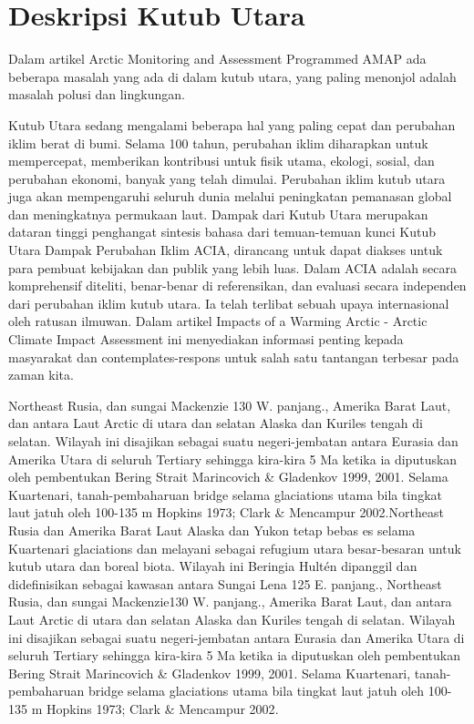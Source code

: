 %

\section{Deskripsi Kutub Utara}	

		Dalam artikel Arctic Monitoring and Assessment Programmed {AMAP}  ada beberapa masalah yang ada di dalam 
	kutub utara, yang paling menonjol adalah masalah polusi dan lingkungan.
		
		Kutub Utara sedang mengalami beberapa hal yang paling cepat dan perubahan iklim berat di bumi. Selama 100 tahun, perubahan
	iklim diharapkan untuk mempercepat, memberikan kontribusi untuk fisik utama, ekologi, sosial, dan perubahan ekonomi, banyak yang 
	telah dimulai. Perubahan iklim kutub utara juga akan mempengaruhi seluruh dunia melalui peningkatan pemanasan global dan meningkatnya permukaan laut. 
	Dampak dari Kutub Utara merupakan dataran tinggi penghangat sintesis bahasa dari temuan-temuan kunci Kutub Utara Dampak Perubahan Iklim {ACIA}, dirancang 
	untuk dapat diakses untuk para pembuat kebijakan dan publik yang lebih luas. Dalam ACIA adalah secara komprehensif diteliti, benar-benar di referensikan,
	dan evaluasi secara independen dari perubahan iklim kutub utara. Ia telah terlibat sebuah upaya internasional oleh ratusan ilmuwan.
	Dalam artikel Impacts of a Warming Arctic - Arctic Climate Impact Assessment ini menyediakan informasi penting kepada masyarakat dan contemplates-respons 
	untuk salah satu tantangan terbesar pada zaman kita.
	
		Northeast Rusia, dan sungai Mackenzie {130 W. panjang.}, Amerika Barat Laut, dan antara Laut Arctic di utara dan selatan Alaska dan
	Kuriles tengah di selatan. Wilayah ini disajikan sebagai suatu negeri-jembatan antara Eurasia dan Amerika Utara di seluruh Tertiary sehingga kira-kira 5 Ma
	ketika ia diputuskan oleh pembentukan Bering Strait {Marincovich \& Gladenkov 1999, 2001}. Selama Kuartenari, tanah-pembaharuan bridge selama glaciations 
	utama bila tingkat laut jatuh oleh 100-135 m {Hopkins 1973; Clark \& Mencampur 2002}.Northeast Rusia dan Amerika Barat Laut {Alaska dan Yukon} tetap bebas es 
	selama Kuartenari glaciations dan melayani sebagai refugium utara besar-besaran untuk kutub utara dan boreal biota. Wilayah ini Beringia Hultén dipanggil dan
	didefinisikan sebagai kawasan antara Sungai Lena {125 E. panjang.}, Northeast Rusia, dan sungai Mackenzie{130 W. panjang.}, 
	Amerika Barat Laut, dan antara Laut Arctic di utara dan selatan Alaska dan Kuriles tengah di selatan. Wilayah ini disajikan sebagai suatu negeri-jembatan antara 
	Eurasia dan Amerika Utara di seluruh Tertiary sehingga kira-kira 5 Ma ketika ia diputuskan oleh pembentukan Bering Strait {Marincovich \& Gladenkov 1999, 2001}. 
	Selama Kuartenari, tanah-pembaharuan bridge selama glaciations utama bila tingkat laut jatuh oleh 100-135 m {Hopkins 1973; Clark \& Mencampur 2002}.
	
